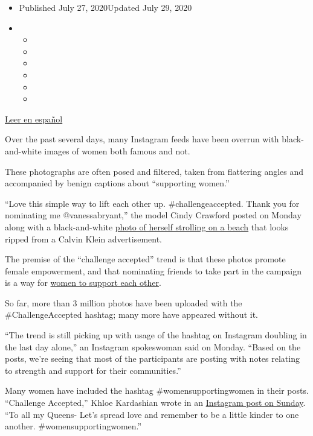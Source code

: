 \begin{itemize}
\item
  Published July 27, 2020Updated July 29, 2020
\item
  \begin{itemize}
  \item
  \item
  \item
  \item
  \item
  \item
  \end{itemize}
\end{itemize}

\href{https://www.nytimes.com/es/2020/07/28/espanol/estilos-de-vida/reto-selfi-blanco-negro.html}{Leer
en español}

Over the past several days, many Instagram feeds have been overrun with
black-and-white images of women both famous and not.

These photographs are often posed and filtered, taken from flattering
angles and accompanied by benign captions about ``supporting women.''

``Love this simple way to lift each other up. \#challengeaccepted. Thank
you for nominating me @vanessabryant,'' the model Cindy Crawford posted
on Monday along with a black-and-white
\href{https://www.instagram.com/p/CDJnHlQFuQi/?igshid=1vzk7hu5crx15}{photo
of herself strolling on a beach} that looks ripped from a Calvin Klein
advertisement.

The premise of the ``challenge accepted'' trend is that these photos
promote female empowerment, and that nominating friends to take part in
the campaign is a way for
\href{https://twitter.com/SoniAggarwal/status/1287784564262223872}{women
to support each other}.

So far, more than 3 million photos have been uploaded with the
\#ChallengeAccepted hashtag; many more have appeared without it.

``The trend is still picking up with usage of the hashtag on Instagram
doubling in the last day alone,'' an Instagram spokeswoman said on
Monday. ``Based on the posts, we're seeing that most of the participants
are posting with notes relating to strength and support for their
communities.''

Many women have included the hashtag \#womensupportingwomen in their
posts. ``Challenge Accepted,'' Khloe Kardashian wrote in an
\href{https://www.instagram.com/p/CDH3xn1BB3W/}{Instagram post on
Sunday}. ``To all my Queens- Let's spread love and remember to be a
little kinder to one another. \#womensupportingwomen.''


